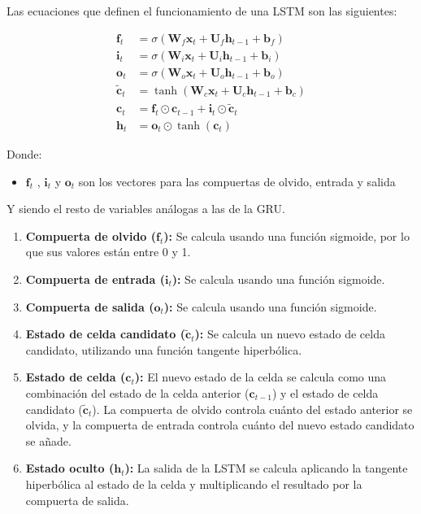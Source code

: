 \documentclass{article}
\begin{document}
Las ecuaciones que definen el funcionamiento de una LSTM son las siguientes:

\begin{align*}
\mathbf{f}_t &= \sigma(\mathbf{W}_f \mathbf{x}_t + \mathbf{U}_f \mathbf{h}_{t-1} + \mathbf{b}_f) \\
\mathbf{i}_t &= \sigma(\mathbf{W}_i \mathbf{x}_t + \mathbf{U}_i \mathbf{h}_{t-1} + \mathbf{b}_i) \\
\mathbf{o}_t &= \sigma(\mathbf{W}_o \mathbf{x}_t + \mathbf{U}_o \mathbf{h}_{t-1} + \mathbf{b}_o) \\
\tilde{\mathbf{c}}_t &= \tanh(\mathbf{W}_c \mathbf{x}_t + \mathbf{U}_c \mathbf{h}_{t-1} + \mathbf{b}_c) \\
\mathbf{c}_t &= \mathbf{f}_t \odot \mathbf{c}_{t-1} + \mathbf{i}_t \odot \tilde{\mathbf{c}}_t \\
\mathbf{h}_t &= \mathbf{o}_t \odot \tanh(\mathbf{c}_t)
\end{align*}

Donde:
\begin{itemize}
     \item \(\mathbf{f}_t\) , \(\mathbf{i}_t\) y \(\mathbf{o}_t\) son los vectores para las compuertas de olvido, entrada y salida
\end{itemize}
Y siendo el resto de variables análogas a las de la GRU.

\begin{enumerate}
     \item \textbf{Compuerta de olvido (\(\mathbf{f}_t\)):} Se calcula usando una función sigmoide, por lo que sus valores están entre 0 y 1.
     \item \textbf{Compuerta de entrada (\(\mathbf{i}_t\)):} Se calcula usando una función sigmoide.
     \item \textbf{Compuerta de salida (\(\mathbf{o}_t\)):} Se calcula usando una función sigmoide.
      \item \textbf{Estado de celda candidato (\(\tilde{\mathbf{c}}_t\)):}  Se calcula un nuevo estado de celda candidato, utilizando una función tangente hiperbólica.
    \item \textbf{Estado de celda (\(\mathbf{c}_t\)):}  El nuevo estado de la celda se calcula como una combinación del estado de la celda anterior (\(\mathbf{c}_{t-1}\)) y el estado de celda candidato (\(\tilde{\mathbf{c}}_t\)).  La compuerta de olvido controla cuánto del estado anterior se olvida, y la compuerta de entrada controla cuánto del nuevo estado candidato se añade.
    \item \textbf{Estado oculto (\(\mathbf{h}_t\)):}  La salida de la LSTM se calcula aplicando la tangente hiperbólica al estado de la celda y multiplicando el resultado por la compuerta de salida.
\end{enumerate}
\end{document}
